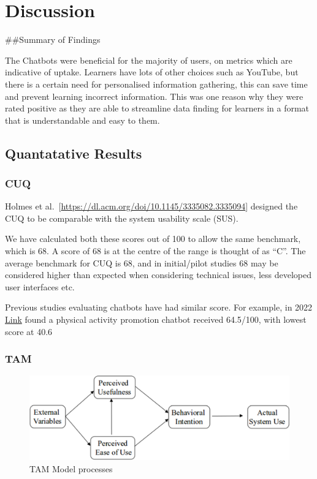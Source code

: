 \documentclass[a4paper, nobind]{templates/ociamthesis}
\begin{document}
\hypertarget{Discussion}{%
\chapter{Discussion}\label{Discussion}}

\minitoc 

\#\#Summary of Findings

The Chatbots were beneficial for the majority of users, on metrics which are indicative of uptake. Learners have lots of other choices such as YouTube, but there is a certain need for personalised information gathering, this can save time and prevent learning incorrect information. This was one reason why they were rated positive as they are able to streamline data finding for learners in a format that is understandable and easy to them.

\hypertarget{quantatative-results}{%
\section{Quantatative Results}\label{quantatative-results}}

\hypertarget{cuq}{%
\subsection{CUQ}\label{cuq}}

Holmes et al.~{[}\url{https://dl.acm.org/doi/10.1145/3335082.3335094}{]} designed the CUQ to be comparable with the system usability scale (SUS).

We have calculated both these scores out of 100 to allow the same benchmark, which is 68.
A score of 68 is at the centre of the range is thought of as ``C''.
The average benchmark for CUQ is 68, and in initial/pilot studies 68 may be considered higher than expected when considering technical issues, less developed user interfaces etc.

Previous studies evaluating chatbots have had similar score.
For example, in 2022 \href{a\%3C\%20href=}{Link} found a physical activity promotion chatbot received 64.5/100, with lowest score at 40.6

\hypertarget{tam}{%
\subsection{TAM}\label{tam}}

\begin{figure}

{\centering \includegraphics[width=0.75\linewidth]{tam1} 

}

\caption{TAM Model processes}\label{fig:tam}
\end{figure}
\end{document}
